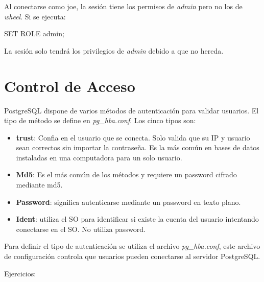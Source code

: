 Al conectarse como joe, la sesión tiene los permisos de \textit{admin} pero no los de \textit{wheel}. Si se ejecuta:\\

\begin{pyglist}
SET ROLE admin;
\end{pyglist}

La sesión solo tendrá los privilegios de \textit{admin} debido a que no hereda.\\

\section{Control de Acceso}

PostgreSQL dispone de varios métodos de autenticación para validar usuarios. El tipo de método se define en \textit{pg\_hba.conf}. Los cinco tipos son:\\

\begin{itemize}
\item \textbf{trust}: Confia en el usuario que se conecta. Solo valida que su IP y usuario sean correctos sin importar la contraseña. Es la más común en bases de datos instaladas en una computadora para un solo usuario.
\item \textbf{Md5}: Es el más común de los métodos y requiere un password cifrado mediante md5.
\item \textbf{Password}: significa autenticarse mediante un password en texto plano.
\item \textbf{Ident}: utiliza el SO para identificar si existe la cuenta del usuario intentando conectarse en el SO. No utiliza password.
\end{itemize}

Para definir el tipo de autenticación se utiliza el archivo \textit{pg\_hba.conf}, este archivo de configuración controla que usuarios pueden conectarse al servidor PostgreSQL.

\newpage

Ejercicios:

